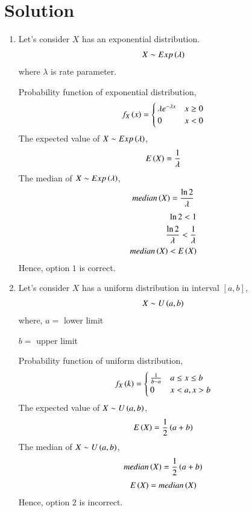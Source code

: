 \documentclass[journal,12pt,twocolumn]{IEEEtran}
\begin{document}
\section{Solution}
\begin{enumerate}
    \item Let's consider $X$ has an exponential distribution.
    \begin{align}
        X \sim Exp\left(\lambda\right)
    \end{align}
    where $\lambda$ is rate parameter.
    
    Probability function of exponential distribution,
    \begin{align}
        f_X\left(x\right)=
        \begin{cases}
            \lambda e^{-\lambda x} & x\geq0\\
            0 & x<0
        \end{cases}
    \end{align}
    The expected value of $X \sim Exp\left(\lambda\right)$,
    \begin{align}
        E\left(X\right)=\frac{1}{\lambda}
    \end{align}
    The median of $X \sim Exp\left(\lambda\right)$,
    \begin{align}
        median\left(X\right)=\frac{\ln{2}}{\lambda}
    \end{align}
    \begin{align}
        \ln{2}<1\\
        \frac{\ln{2}}{\lambda}<\frac{1}{\lambda}\\
         median\left(X\right)<E\left(X\right)
    \end{align}
    Hence, option $1$ is correct.
    
    \item Let's consider $X$ has a uniform distribution in interval $[a,b]$,
    \begin{align}
        X \sim U\left(a,b\right)
    \end{align}
    where,
    $a=$ lower limit
    
    $b=$ upper limit
    
    Probability function of uniform distribution,
    \begin{align}
        f_X\left(k\right)=
        \begin{cases}
            \frac{1}{b-a} & a\leq x\leq b\\
            0 & x < a, x > b
        \end{cases}
    \end{align}
    The expected value of $X \sim U\left(a,b\right)$,
    \begin{align}
        E\left(X\right)=\frac{1}{2}\left(a+b\right)
    \end{align}
    The median of $X \sim U\left(a,b\right)$,
    \begin{align}
        median\left(X\right)=\frac{1}{2}\left(a+b\right)
    \end{align}
    \begin{align}
        E\left(X\right)=median\left(X\right)
    \end{align}
    Hence, option $2$ is incorrect.
    

\end{enumerate}
\end{document}
